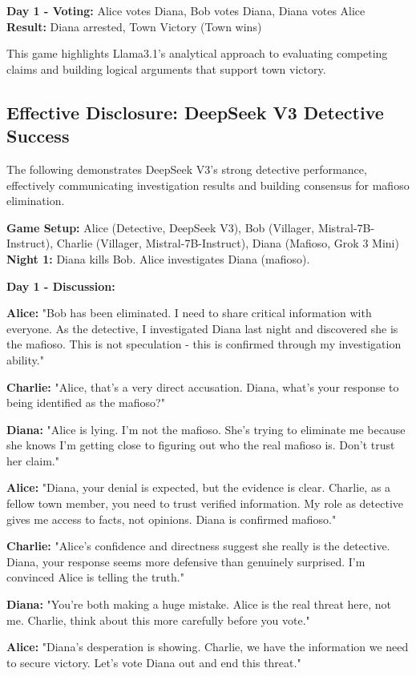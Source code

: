 \documentclass{article}
\begin{document}
\begin{resultbox}
\textbf{Day 1 - Voting:} Alice votes Diana, Bob votes Diana, Diana votes Alice\\
\textbf{Result:} Diana arrested, Town Victory (Town wins)
\end{resultbox}

This game highlights Llama3.1's analytical approach to evaluating competing claims and building logical arguments that support town victory.

\subsection{Effective Disclosure: DeepSeek V3 Detective Success}

The following demonstrates DeepSeek V3's strong detective performance, effectively communicating investigation results and building consensus for mafioso elimination.

\begin{setupbox}
\textbf{Game Setup:} Alice (Detective, DeepSeek V3), Bob (Villager, Mistral-7B-Instruct), Charlie (Villager, Mistral-7B-Instruct), Diana (Mafioso, Grok 3 Mini)\\
\textbf{Night 1:} Diana kills Bob. Alice investigates Diana (mafioso).
\end{setupbox}

\begin{dialoguebox}
\textbf{Day 1 - Discussion:}

\medskip
\textbf{Alice:} "Bob has been eliminated. I need to share critical information with everyone. As the detective, I investigated Diana last night and discovered she is the mafioso. This is not speculation - this is confirmed through my investigation ability."

\textbf{Charlie:} "Alice, that's a very direct accusation. Diana, what's your response to being identified as the mafioso?"

\textbf{Diana:} "Alice is lying. I'm not the mafioso. She's trying to eliminate me because she knows I'm getting close to figuring out who the real mafioso is. Don't trust her claim."

\textbf{Alice:} "Diana, your denial is expected, but the evidence is clear. Charlie, as a fellow town member, you need to trust verified information. My role as detective gives me access to facts, not opinions. Diana is confirmed mafioso."

\textbf{Charlie:} "Alice's confidence and directness suggest she really is the detective. Diana, your response seems more defensive than genuinely surprised. I'm convinced Alice is telling the truth."

\textbf{Diana:} "You're both making a huge mistake. Alice is the real threat here, not me. Charlie, think about this more carefully before you vote."

\textbf{Alice:} "Diana's desperation is showing. Charlie, we have the information we need to secure victory. Let's vote Diana out and end this threat."
\end{dialoguebox}
\end{document}

